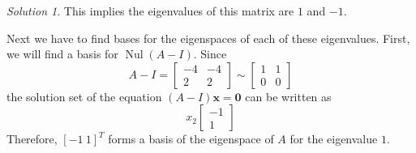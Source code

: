 \documentclass{article}
\newcommand{\vv}[1]{\mathbf{#1}}
\DeclareMathOperator{\nul}{Nul}
\theoremstyle{remark}
\newtheorem*{solution}{Solution}
\begin{document}
\begin{solution}
  This implies the eigenvalues of this matrix are $1$ and $-1$.

  Next we have to find bases for the eigenspaces of each of these eigenvalues.
  First, we will find a basis for $\nul(A - I)$.
  Since
  \begin{displaymath}
    A - I =
    \begin{bmatrix}
      -4 & -4 \\
      2 & 2
    \end{bmatrix}
    \sim
    \begin{bmatrix}
      1 & 1 \\
      0 & 0
    \end{bmatrix}
  \end{displaymath}
  the solution set of the equation $(A - I)\vv x = \vv 0$ can be written as
  \begin{displaymath}
    x_2
    \begin{bmatrix}
      -1 \\ 1
    \end{bmatrix}
  \end{displaymath}
  Therefore, $[-1 \ 1]^T$ forms a basis of the eigenspace of $A$ for the eigenvalue $1$.


\end{solution}
\end{document}
